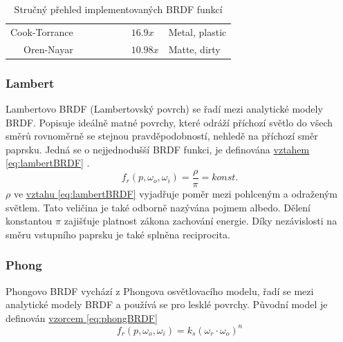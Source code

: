 \documentclass[czech,master,dept460,male,cpp,cpdeclaration]{diploma}
\newcommand{\point}{p}
\newcommand{\brdf}{f_r\left(\point,\omega_{o},\omega_{i}\right)}
\newcommand{\outVec}{\omega_{o}}
\newcommand{\refl}{\omega_{r}}
\newcommand{\alb}{\rho}
\newcommand{\true}{\ding{51}}
\newcommand{\false}{\ding{55}}
\begin{document}
\begin{table}[ht]
\begin{tabular}{r|lllllll}
        Cook-Torrance       & \true                    & \true                     & \true                       & \false                      & \false                   & \(16.9x\)                          & Metal, plastic                \\
        Oren-Nayar          & \true                    & \true                     & \false                      & \false                      & \true                    & \(10.98x\)                         & Matte, dirty                  \\
        \hline
    \end{tabular}
    \caption{Stručný přehled implementovaných BRDF funkcí}
    \label{tab:brdfProperties}
\end{table}

\subsubsection{Lambert} \label{sec:Lambert}
Lambertovo BRDF (Lambertovský povrch) se řadí mezi analytické modely BRDF. Popisuje ideálně matné povrchy, které odráží příchozí světlo do všech směrů rovnoměrně se stejnou pravděpodobností, nehledě na příchozí směr paprsku. Jedná se o nejjednodušší BRDF funkci, je definována \hyperref[eq:lambertBRDF]{vztahem \ref{eq:lambertBRDF}} \cite{Koppal2014}.
\begin{equation} \label{eq:lambertBRDF}
    \brdf = \frac{\alb}{\pi} = konst.
\end{equation}
\(\alb\) ve \hyperref[eq:lambertBRDF]{vztahu \ref{eq:lambertBRDF}} vyjadřuje poměr mezi pohlceným a odraženým světlem. Tato veličina je také odborně nazývána pojmem albedo. Dělení konstantou \(\pi\) zajišťuje platnost zákona zachování energie. Díky nezávislosti na směru vstupního paprsku je také splněna reciprocita.

\subsubsection{Phong} \label{sec:Phong}
Phongovo BRDF vychází z Phongova osvětlovacího modelu, řadí se mezi analytické modely BRDF a používá se pro lesklé povrchy. Původní model je definován \hyperref[eq:phongBRDF]{vzorcem \ref{eq:phongBRDF}} \cite{Phong1975}
\begin{equation} \label{eq:phongBRDF}
    \brdf = k_s(\refl\cdot\outVec)^n
\end{equation}
\end{document}
